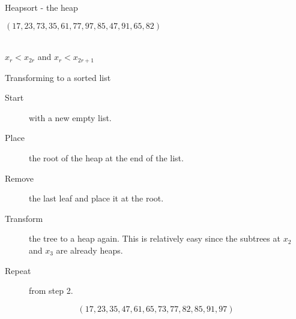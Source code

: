 \begin{frame}[fragile]{Heapsort - the heap}
  \begin{center}
    $(17,23,73,35,61,77,97,85,47,91,65,82)$ \\[2mm]
     \\[2mm]
    $x_r < x_{2r}$ and $x_r < x_{2r+1}$
  \end{center}
\end{frame}


\begin{frame}{Transforming to a sorted list}
  \begin{description}
    \item[Start] with a new empty list.
    \item[Place] the root of the heap at the end of the list.
    \item[Remove] the last leaf and place it at the root.
    \item[Transform] the tree to a heap again. This is relatively easy since the subtrees at $x_2$ and $x_3$ are already heaps.
    \item[Repeat] from step 2.
  \end{description}
  \vspace{4mm}
  $$ (17,23,35,47,61,65,73,77,82,85,91,97) $$
\end{frame}
